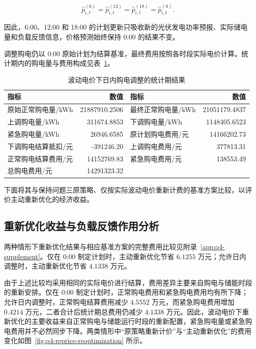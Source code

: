 \documentclass[12pt,a4paper]{ctexart}
\renewcommand{\textbf}[1]{{\CJKfamily{heiti}\bfseries #1}}
\begin{document}
\begin{equation}
\widehat{p}_{i,t}^{(6)}
=
\widehat{p}_{i,t}^{(12)}
=
\widehat{p}_{i,t}^{(18)}
=
\widehat{p}_{i,t}^{(0)}.
\label{eq:q4-price-frozen-intraday}
\end{equation}

\par\noindent 因此，6:00、12:00 和 18:00 的计划更新只吸收新的光伏发电功率预报、实际储电量和负载反馈信息，价格预测始终保持 0:00 的结果不变。

调整购电仍以 0:00 原始计划为结算基准，最终费用按照各时段实际电价计算。统计期内的购电量与费用构成见表~\ref{tab:q4-intraday-result}。

\begin{table}[htbp]
\centering
\small
\setlength{\tabcolsep}{3pt}
\caption{波动电价下日内购电调整的统计期结果}
\label{tab:q4-intraday-result}
\renewcommand{\arraystretch}{1.15}
\begin{tabular}{lrlr}
\toprule
\textbf{指标} & \textbf{数值} & \textbf{指标} & \textbf{数值} \\
\midrule
原始正常购电量/kWh & 21887910.2506 & 最终正常购电量/kWh & 21051179.4837 \\
上调购电量/kWh & 311674.8853 & 下调购电量/kWh & 1148405.6523 \\
紧急购电量/kWh & 26946.6585 & 原计划购电费用/元 & 14166202.73 \\
下调购电结算抵扣/元 & -391246.20 & 上调购电费用/元 & 377813.31 \\
正常购电结算费用/元 & 14152769.83 & 紧急购电费用/元 & 138553.49 \\
总购电费用/元 & 14291323.32 & & \\
\bottomrule
\end{tabular}
\end{table}

下面将其与保持问题三原策略、仅按实际波动电价重新计费的基准方案比较，以评价主动重新优化的经济收益。


\subsection{重新优化收益与负载反馈作用分析}
两种情形下重新优化结果与相应基准方案的完整费用比较见附录~\ref{app:q4-supplement}。仅在 0:00 制定计划时，主动重新优化节省 $6.1255$ 万元；允许日内调整时，主动重新优化节省 $4.1338$ 万元。

由于上述比较均采用相同的实际电价进行结算，费用差异主要来自购电与储能时段的重新安排。仅在 0:00 制定计划时，正常购电费用和紧急购电费用均有所下降；允许日内调整时，正常购电结算费用减少 $4.5552$ 万元，而紧急购电费用增加 $0.4214$ 万元，二者合计后统计期总费用仍减少 $4.1338$ 万元。因此，波动电价下重新优化的主要收益来自正常购电与储能运行时段的重新配置，紧急购电量或紧急购电费用并不必然同步下降。两类情形中“原策略重新计价”与“主动重新优化”的费用变化如图~\ref{fig:q4-reprice-reoptimization} 所示。
\end{document}
